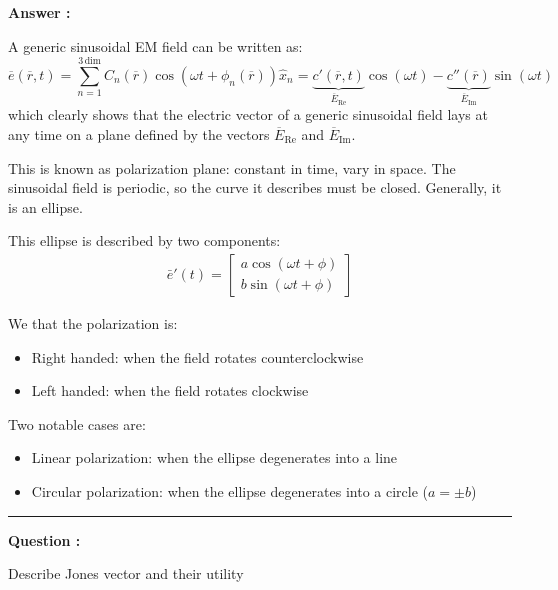 \documentclass[a4paper,11pt]{book}
\newcounter{qacount}
\newenvironment{question}{
  \refstepcounter{qacount}
  \vspace{1em} %
  \noindent\textbf{Question \theqacount:}\space
}{
  \par %
}
\newenvironment{answer}{
  \noindent\textbf{Answer \theqacount:}\space
}{
  \par\vspace{1em}   %
  \hrule             %
  \vspace{0.5em}     %
}
\begin{document}
\begin{answer}
    A generic sinusoidal EM field can be written as:
    \begin{equation}
        \overline{e}(\overline{r}, t) = \sum_{n=1}^{3 \, \text{dim}} C_n(\overline{r}) \cos(\omega t + \phi_n(\overline{r})) \hat{x}_n = \underbrace{c'(\overline{r}, t)}_{\overline{E}_{\text{Re}}} \cos(\omega t) - \underbrace{c''(\overline{r})}_{\overline{E}_{\text{Im}}} \sin(\omega t)
    \end{equation}
    which clearly shows that the electric vector of a generic sinusoidal field lays at any time on a plane defined by the vectors $\overline{E}_{\text{Re}}$ and $\overline{E}_{\text{Im}}$.

    This is known as polarization plane: constant in time, vary in space.
    The sinusoidal field is periodic, so the curve it describes must be closed. Generally, it is an ellipse.

    This ellipse is described by two components:
    \begin{align}
        \bar{e}'(t) =
        \begin{bmatrix} a \cos(\omega t + \phi) \\ b \sin(\omega t + \phi)
        \end{bmatrix}
    \end{align}

    We that the polarization is:
    \begin{itemize}
        \item Right handed: when the field rotates counterclockwise
        \item Left handed: when the field rotates clockwise
    \end{itemize}
    Two notable cases are:
    \begin{itemize}
        \item Linear polarization: when the ellipse degenerates into a line
        \item Circular polarization: when the ellipse degenerates into a circle ($a=\pm b$)
    \end{itemize}
\end{answer}

\begin{question}
    Describe Jones vector and their utility
\end{question}
\end{document}

